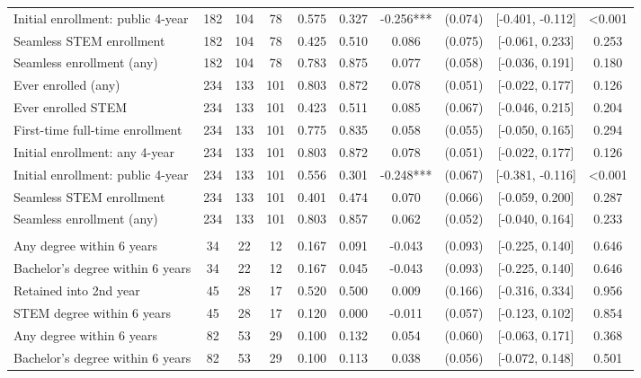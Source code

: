 \begin{table}[t]
\begin{tabular*}{\linewidth}{@{\extracolsep{\fill}}l|ccccccccc}
Initial enrollment: public 4-year & 182 & 104 & 78 & 0.575 & 0.327 & -0.256*** & (0.074) & [-0.401, -0.112] & <0.001 \\ 
Seamless STEM enrollment & 182 & 104 & 78 & 0.425 & 0.510 & 0.086 & (0.075) & [-0.061, 0.233] & 0.253 \\ 
Seamless enrollment (any) & 182 & 104 & 78 & 0.783 & 0.875 & 0.077 & (0.058) & [-0.036, 0.191] & 0.180 \\ 
Ever enrolled (any) & 234 & 133 & 101 & 0.803 & 0.872 & 0.078 & (0.051) & [-0.022, 0.177] & 0.126 \\ 
Ever enrolled STEM & 234 & 133 & 101 & 0.423 & 0.511 & 0.085 & (0.067) & [-0.046, 0.215] & 0.204 \\ 
First-time full-time enrollment & 234 & 133 & 101 & 0.775 & 0.835 & 0.058 & (0.055) & [-0.050, 0.165] & 0.294 \\ 
Initial enrollment: any 4-year & 234 & 133 & 101 & 0.803 & 0.872 & 0.078 & (0.051) & [-0.022, 0.177] & 0.126 \\ 
Initial enrollment: public 4-year & 234 & 133 & 101 & 0.556 & 0.301 & -0.248*** & (0.067) & [-0.381, -0.116] & <0.001 \\ 
Seamless STEM enrollment & 234 & 133 & 101 & 0.401 & 0.474 & 0.070 & (0.066) & [-0.059, 0.200] & 0.287 \\ 
Seamless enrollment (any) & 234 & 133 & 101 & 0.803 & 0.857 & 0.062 & (0.052) & [-0.040, 0.164] & 0.233 \\ 
\midrule\addlinespace[2.5pt]
\multicolumn{10}{l}{{\itshape \textbf{Panel C: Degree and Persistence Outcomes} \emph{(non-censored subsample)}}} \\[2.5pt] 
\midrule\addlinespace[2.5pt]
Any degree within 6 years & 34 & 22 & 12 & 0.167 & 0.091 & -0.043 & (0.093) & [-0.225, 0.140] & 0.646 \\ 
Bachelor's degree within 6 years & 34 & 22 & 12 & 0.167 & 0.045 & -0.043 & (0.093) & [-0.225, 0.140] & 0.646 \\ 
Retained into 2nd year & 45 & 28 & 17 & 0.520 & 0.500 & 0.009 & (0.166) & [-0.316, 0.334] & 0.956 \\ 
STEM degree within 6 years & 45 & 28 & 17 & 0.120 & 0.000 & -0.011 & (0.057) & [-0.123, 0.102] & 0.854 \\ 
Any degree within 6 years & 82 & 53 & 29 & 0.100 & 0.132 & 0.054 & (0.060) & [-0.063, 0.171] & 0.368 \\ 
Bachelor's degree within 6 years & 82 & 53 & 29 & 0.100 & 0.113 & 0.038 & (0.056) & [-0.072, 0.148] & 0.501 \\ 

\end{tabular*}
\end{table}
